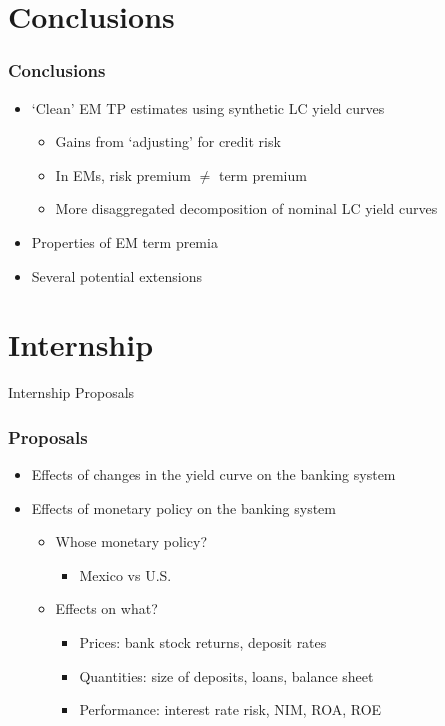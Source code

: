 \documentclass[12pt, aspectratio=169, xcolor=dvipsnames]{beamer} 			         %
\begin{document}
\section{Conclusions}

\begin{frame}
	\frametitle{Conclusions}
	\begin{itemize}
		\item `Clean' EM TP estimates using synthetic LC yield curves
		\begin{itemize}
			\item Gains from `adjusting' for credit risk
			\item In EMs, risk premium $\neq$ term premium
			\item More disaggregated decomposition of nominal LC yield curves
		\end{itemize}
		\item Properties of EM term premia
		\item Several potential extensions
	\end{itemize}
\end{frame}

\section{Internship}

\begin{frame}
\begin{center}
	\huge \textcolor{yaleblue}{Internship Proposals}
\end{center}
\end{frame}

\begin{frame}
	\frametitle{Proposals}
	\begin{itemize}
		\item Effects of changes in the yield curve on the banking system
		\item Effects of monetary policy on the banking system
		\begin{itemize}
			\item Whose monetary policy?
			\begin{itemize}
				\item Mexico vs U.S.
			\end{itemize}
			\item Effects on what?
			\begin{itemize}
				\item Prices: bank stock returns, deposit rates
				\item Quantities: size of deposits, loans, balance sheet
				\item Performance: interest rate risk, NIM, ROA, ROE
			\end{itemize}
		\end{itemize}
	\end{itemize}
\end{frame}
\end{document}

